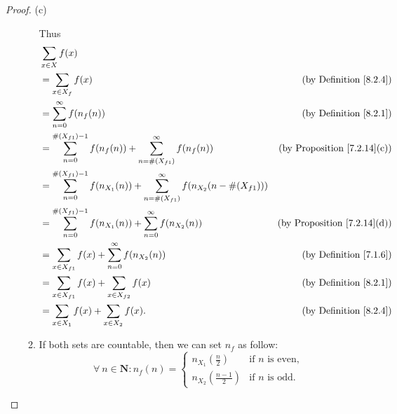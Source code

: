\begin{proof}{(c)}
\begin{enumerate}[label=(\Roman*)]
\begin{enumerate}[label=(\roman*)]
                        Thus
                        \begin{align*}
                             & \sum_{x \in X} f(x)                                                                                                                               \\
                             & = \sum_{x \in X_f} f(x)                                                                                 & \text{(by Definition \ref{8.2.4})}      \\
                             & = \sum_{n = 0}^\infty f(n_f(n))                                                                         & \text{(by Definition \ref{8.2.1})}      \\
                             & = \sum_{n = 0}^{\#(X_{f1}) - 1} f(n_f(n)) + \sum_{n = \#(X_{f1})}^\infty f(n_f(n))                      & \text{(by Proposition \ref{7.2.14}(c))} \\
                             & = \sum_{n = 0}^{\#(X_{f1}) - 1} f(n_{X_1}(n)) + \sum_{n = \#(X_{f1})}^\infty f(n_{X_2}(n - \#(X_{f1})))                                           \\
                             & = \sum_{n = 0}^{\#(X_{f1}) - 1} f(n_{X_1}(n)) + \sum_{n = 0}^\infty f(n_{X_2}(n))                       & \text{(by Proposition \ref{7.2.14}(d))} \\
                             & = \sum_{x \in X_{f1}} f(x) + \sum_{n = 0}^\infty f(n_{X_2}(n))                                          & \text{(by Definition \ref{7.1.6})}      \\
                             & = \sum_{x \in X_{f1}} f(x) + \sum_{x \in X_{f2}} f(x)                                                   & \text{(by Definition \ref{8.2.1})}      \\
                             & = \sum_{x \in X_1} f(x) + \sum_{x \in X_2} f(x).                                                        & \text{(by Definition \ref{8.2.4})}
                        \end{align*}
                  \item If both sets are countable, then we can set \(n_f\) as follow:
                        \[
                            \forall\ n \in \mathbf{N} : n_f(n) = \begin{cases}
                                n_{X_1}(\frac{n}{2})     & \text{if } n \text{ is even}, \\
                                n_{X_2}(\frac{n - 1}{2}) & \text{if } n \text{ is odd}.

\end{cases}\]
\end{enumerate}
\end{enumerate}
\end{proof}
